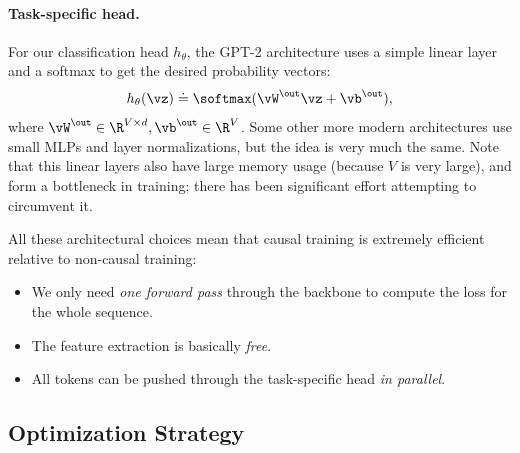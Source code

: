 \documentclass[../../book-main.tex]{subfiles}
\begin{document}
\paragraph{Task-specific head.} For our classification head
\(h_{\theta}\), the GPT-2 architecture uses a simple linear layer and
a softmax to get the desired probability vectors:
\begin{equation}
h_{\theta}(\vz) \doteq \softmax(\vW^{\out}\vz + \vb^{\out}) ,
\end{equation}
where \(\vW^{\out} \in \R^{V \times d}, \vb^{\out} \in \R^{V}\). Some
other more modern architectures use small MLPs and layer
normalizations, but the idea is very much the same. Note that this
linear layers also have large memory usage (because \(V\) is very
large), and form a bottleneck in training; there has been significant
effort attempting to circumvent it.

All these architectural choices mean that causal training is
extremely efficient relative to non-causal training:
\begin{itemize}
\item We only need \textit{one forward pass} through the backbone to
    compute the loss for the whole sequence.
\item The feature extraction is basically \textit{free}.
\item All tokens can be pushed through the task-specific head
    \textit{in parallel}.
\end{itemize}

\subsection{Optimization Strategy}
\end{document}
